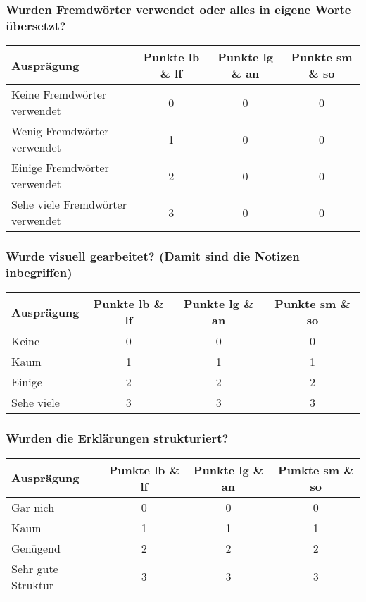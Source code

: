 \subsubsection{Wurden Fremdwörter verwendet oder alles in eigene Worte übersetzt?}
\begin{tabular}{| l | c | c | c |}
  \hline	
  \textbf{Ausprägung} & \textbf{Punkte lb \& lf} & \textbf{Punkte lg \& an} & \textbf{Punkte sm \& so} \\
  \hline  		
  Keine Fremdwörter verwendet & 0  & 0 & 0 \\ 
  \hline
  Wenig Fremdwörter verwendet & 1 & 0 & 0 \\ 
  \hline
  Einige Fremdwörter verwendet & 2 & 0 & 0 \\
  \hline  
  Sehe viele Fremdwörter verwendet & 3 & 0 &  0 \\
  \hline  
\end{tabular}

\subsubsection{Wurde visuell gearbeitet? (Damit sind die Notizen inbegriffen)}
\begin{tabular}{| l | c | c | c |}
  \hline	
  \textbf{Ausprägung} & \textbf{Punkte lb \& lf} & \textbf{Punkte lg \& an} & \textbf{Punkte sm \& so} \\
  \hline  		
  Keine & 0  & 0 & 0 \\ 
  \hline
  Kaum & 1 & 1 & 1 \\ 
  \hline
  Einige & 2 & 2 & 2 \\
  \hline  
  Sehe viele & 3 & 3 & 3 \\
  \hline  
\end{tabular}

\subsubsection{Wurden die Erklärungen strukturiert?}
\begin{tabular}{| l | c | c | c |}
  \hline	
  \textbf{Ausprägung} & \textbf{Punkte lb \& lf} & \textbf{Punkte lg \& an} & \textbf{Punkte sm \& so} \\
  \hline  		
  Gar nich & 0  & 0 & 0 \\ 
  \hline
  Kaum & 1 & 1 & 1 \\ 
  \hline
  Genügend & 2 & 2 & 2 \\
  \hline  
  Sehr gute Struktur & 3 & 3 & 3 \\
  \hline  
\end{tabular}

